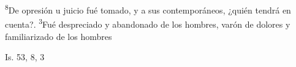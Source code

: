 \documentclass[../../rosario.tex]{subfiles}
\begin{document}
    \textsuperscript{8}De opresión u juicio fué tomado, y a sus contemporáneos, ¿quién tendrá en cuenta?. \textsuperscript{3}Fué despreciado y abandonado de los hombres,
    varón de dolores y familiarizado de los hombres
    \begin{flushright}
    Is. 53, 8, 3
    \end{flushright}
\end{document}
